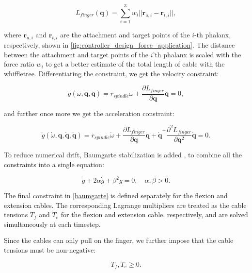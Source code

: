 \begin{equation}
    L_{finger}(\mathbf{q}) = \sum_{i = 1}^{3} w_i ||\mathbf{r}_{a, i} - \mathbf{r}_{t, i}||,
\end{equation}

where $\mathbf{r}_{a, i}$ and $\mathbf{r}_{t, i}$ are the attachment and target points of the $i$-th phalanx, respectively, shown in \cref{fig:controller_design_force_application}. The distance between the attachment and target points of the $i$'th phalanx is scaled with the force ratio $w_i$ to get a better estimate of the total length of cable with the whiffletree. Differentiating the constraint, we get the velocity constraint:

\begin{equation}
    \dot{g}(\omega, \mathbf{q}, \dot{\mathbf{q}}) = r_{spindle} \omega + \frac{\partial L_{finger}}{\partial \mathbf{q}} \dot{\mathbf{q}} = 0,
\end{equation}

and further once more we get the acceleration constraint:

\begin{equation}
    \ddot{g}(\dot{\omega}, \mathbf{q}, \dot{\mathbf{q}}, \ddot{\mathbf{q}}) = r_{spindle} \dot{\omega} + \frac{\partial L_{finger}}{\partial \mathbf{q}} \ddot{\mathbf{q}} + \dot{\mathbf{q}}^\intercal \frac{\partial^2 L_{finger}}{\partial \mathbf{q}^2} \dot{\mathbf{q}} = 0.   
\end{equation}

To reduce numerical drift, Baumgarte stabilization is added \parencite{baumgarteStabilizationConstraintsIntegrals1972}, to combine all the constraints into a single equation:

\begin{equation}
    \label{baumgarte}
    \ddot{g} + 2\alpha \dot{g} + \beta^2 g = 0, \quad \alpha, \beta > 0.
\end{equation}

The final constraint in \cref{baumgarte} is defined separately for the flexion and extension cables. The corresponding Lagrange multipliers are treated as the cable tensions $T_f$ and $T_e$ for the flexion and extension cable, respectively, and are solved simultaneously at each timestep.

Since the cables can only pull on the finger, we further impose that the cable tensions must be non-negative:

\begin{equation}
    T_f, T_e \geq 0.
\end{equation}

